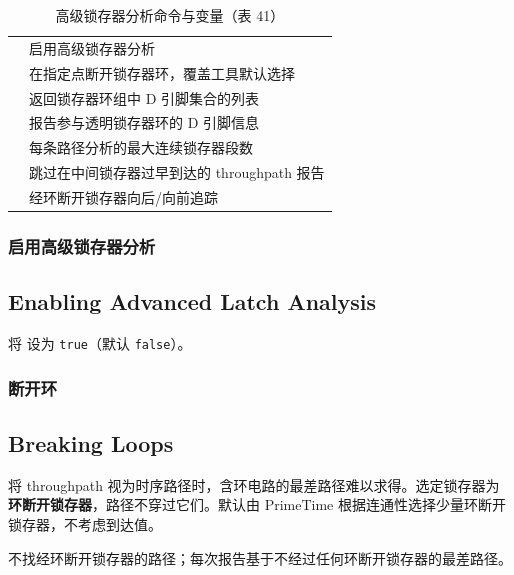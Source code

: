 \begin{table}[htbp]
\centering
\caption{高级锁存器分析命令与变量（表 41）}
\small
\begin{tabular}{|L{5.5cm}|L{7.5cm}|}
\hline
{} &  \\
\hline
{} & 启用高级锁存器分析 \\
 & 在指定点断开锁存器环，覆盖工具默认选择 \\
 & 返回锁存器环组中 D 引脚集合的列表 \\
 & 报告参与透明锁存器环的 D 引脚信息 \\
 & 每条路径分析的最大连续锁存器段数 \\
 & 跳过在中间锁存器过早到达的 throughpath 报告 \\
 & 经环断开锁存器向后/向前追踪 \\
\hline
\end{tabular}
\end{table}

\subsubsection{启用高级锁存器分析}
\subsection*{Enabling Advanced Latch Analysis}

将  设为 \texttt{true}（默认 \texttt{false}）。

\subsubsection{断开环}
\subsection*{Breaking Loops}

将 throughpath 视为时序路径时，含环电路的最差路径难以求得。选定锁存器为\textbf{环断开锁存器}，路径不穿过它们。默认由 PrimeTime 根据连通性选择少量环断开锁存器，不考虑到达值。

 不找经环断开锁存器的路径；每次报告基于不经过任何环断开锁存器的最差路径。

